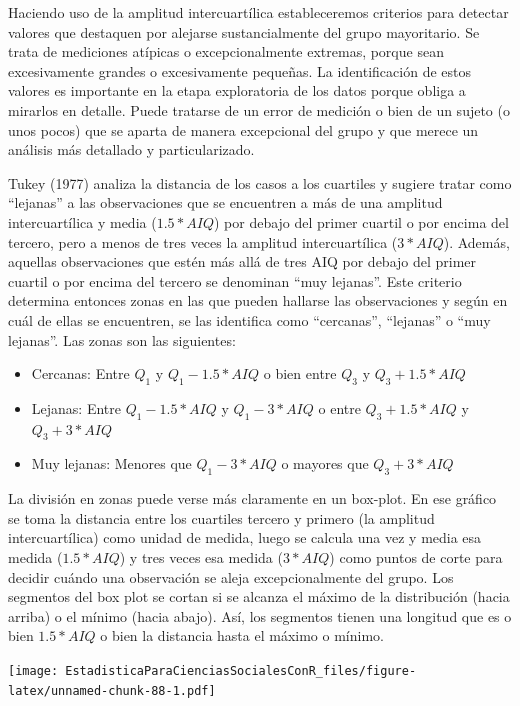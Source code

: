 \documentclass[]{book}
\providecommand{\tightlist}{%
  \setlength{\itemsep}{0pt}\setlength{\parskip}{0pt}}
\begin{document}
Haciendo uso de la amplitud intercuartílica estableceremos criterios
para detectar valores que destaquen por alejarse sustancialmente del
grupo mayoritario. Se trata de mediciones atípicas o excepcionalmente
extremas, porque sean excesivamente grandes o excesivamente pequeñas. La
identificación de estos valores es importante en la etapa exploratoria
de los datos porque obliga a mirarlos en detalle. Puede tratarse de un
error de medición o bien de un sujeto (o unos pocos) que se aparta de
manera excepcional del grupo y que merece un análisis más detallado y
particularizado.

Tukey (1977) analiza la distancia de los casos a los cuartiles y sugiere
tratar como ``lejanas'' a las observaciones que se encuentren a más de una
amplitud intercuartílica y media (\(1.5*AIQ\)) por debajo del primer
cuartil o por encima del tercero, pero a menos de tres veces la amplitud
intercuartílica (\(3*AIQ\)). Además, aquellas observaciones que estén más
allá de tres AIQ por debajo del primer cuartil o por encima del tercero
se denominan ``muy lejanas''. Este criterio determina entonces zonas en
las que pueden hallarse las observaciones y según en cuál de ellas se
encuentren, se las identifica como ``cercanas'', ``lejanas'' o ``muy
lejanas''. Las zonas son las siguientes:

\begin{itemize}
\tightlist
\item
  Cercanas: Entre \(Q_1\) y \(Q_1-1.5*AIQ\) o bien entre \(Q_3\) y \(Q_3+1.5*AIQ\)
\item
  Lejanas: Entre \(Q_1-1.5*AIQ\) y \(Q_1-3*AIQ\) o entre \(Q_3+1.5*AIQ\) y \(Q_3+3*AIQ\)
\item
  Muy lejanas: Menores que \(Q_1-3*AIQ\) o mayores que \(Q_3+3*AIQ\)
\end{itemize}

La división en zonas puede verse más claramente en un box-plot. En ese gráfico se toma la distancia entre los cuartiles tercero y
primero (la amplitud intercuartílica) como unidad de medida, luego se calcula una vez y media esa medida (\(1.5*AIQ\)) y tres veces esa
medida (\(3*AIQ\)) como puntos de corte para decidir cuándo una observación se aleja excepcionalmente del grupo. Los segmentos del box plot se cortan si se alcanza el máximo de la distribución (hacia arriba) o el mínimo (hacia abajo). Así, los segmentos tienen una longitud que es o bien \(1.5*AIQ\) o bien la distancia hasta el máximo o mínimo.

\texttt{[image: EstadisticaParaCienciasSocialesConR\_files/figure-latex/unnamed-chunk-88-1.pdf]}
\end{document}
